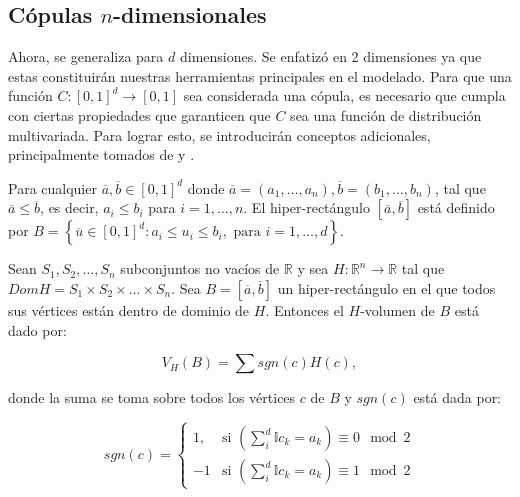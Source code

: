 \subsection{Cópulas $n$-dimensionales}

Ahora, se generaliza para $d$ dimensiones. Se enfatizó en 2 dimensiones ya que estas constituirán nuestras herramientas principales en el modelado. Para que una función $C: [0, 1]^d \to [0, 1]$ sea considerada una cópula, es necesario que cumpla con ciertas propiedades que garanticen que $C$ sea una función de distribución multivariada. Para lograr esto, se introducirán conceptos adicionales, principalmente tomados de \cite{nelsenintroduction} y \cite{TesisEmanuel}.

\begin{defn}
    Para cualquier $\overline{a}, \overline{b} \in [0, 1]^d$ donde $\overline{a}=(a_1,\ldots,a_n), \overline{b}=(b_1,\ldots,b_n)$, tal que $\overline{a} \leq \overline{b}$, es decir, $a_i \leq b_i$ para $i = 1, \dots, n$. El hiper-rectángulo $ [\overline{a}, \overline{b}]$ está definido por $B = \left\{ \overline{u} \in [0, 1]^d : a_i \leq u_i \leq b_i, \text{  para } i = 1 , \dots, d \right\}$.
\end{defn}

\begin{defn}
    Sean $S_1, S_2, \dots, S_n$ subconjuntos no vacíos de $\mathbb{R}$ y sea $H:\mathbb{R}^n  \to \mathbb{R}$ tal que $Dom H = S_1 \times S_2 \times \dots \times S_n$. Sea $B = [\overline{a}, \overline{b}]$ un hiper-rectángulo en el que todos sus vértices están dentro de dominio de $H$. Entonces el $H$-volumen de $B$ está dado por: 

    \begin{equation}
        V_H(B) = \sum sgn(c) H(c),
    \end{equation}

    donde la suma se toma sobre todos los vértices $c$ de $B$ y $sgn(c)$ está dada por:

    \begin{equation}
        sgn(c) = \left\{\begin{matrix}
    1, & \text{si } (\sum_{i}^{d} \mathbb{I} c_k = a_k) \equiv 0 \mod 2\\
    -1 & \text{si }  (\sum_{i}^{d} \mathbb{I} c_k = a_k) \equiv 1 \mod 2
\end{matrix}\right.
    \end{equation}
\end{defn}

